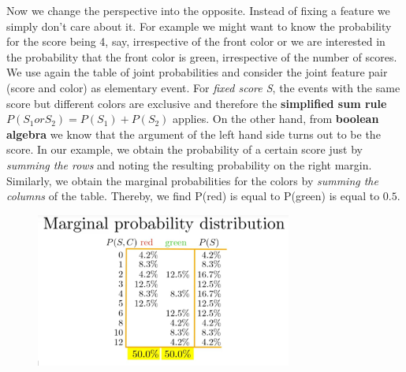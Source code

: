 \documentclass[12pt, a4paper]{scrartcl}
\begin{document}
Now we change the perspective into the opposite. Instead of fixing a feature we simply don’t care about it.
For example we might want to know the probability for the score being 4, say, irrespective of the front color or we are interested in the probability that the front color is green, irrespective of the number of scores.
We use again the table of joint probabilities and consider the joint feature pair (score and color) as elementary event. 
For \textit{fixed score S}, the events with the same score but different colors are exclusive and therefore the \textbf{simplified sum rule} $P(S_1 or S_2)=P(S_1)+P(S_2)$ applies.%
On the other hand, from \textbf{boolean algebra} we know that the argument of the left hand side turns out to be the score. 
In our example, we obtain the probability of a certain score just by \textit{summing the rows} and noting the resulting probability on the right margin.
Similarly, we obtain the marginal probabilities for the colors by \textit{summing the columns} of the table.
Thereby, we find  P(red) is equal to P(green) is equal to $0.5$. %
\begin{figure}[H]
	\centering
	\includegraphics[width=0.75\textwidth]{3_7.png}
\end{figure}

\\
\end{document}
